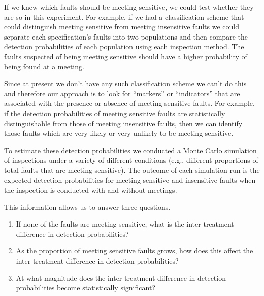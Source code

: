 If we knew which faults should be meeting sensitive, we could test 
whether they are so in this experiment. 
For example, if we had  
a classification scheme that could distinguish meeting sensitive 
from meeting insensitive faults we could 
separate each specification's faults into two 
populations and then compare the detection 
probabilities of each population using each inspection method.
The faults suspected of being meeting sensitive should have a higher
probability of being found at a meeting.

Since at present we don't have any such classification scheme
we can't do this and therefore our approach is to look
for ``markers'' or ``indicators'' that are associated with the
presence or absence of meeting sensitive faults.
For example, if the detection probabilities of meeting sensitive 
faults are statistically distinguishable from
those of meeting insensitive faults, then we can identify 
those faults which are very likely or very unlikely to be
meeting sensitive.  

To estimate these detection probabilities we conducted a
Monte Carlo simulation of inspections under a variety of 
different conditions (e.g., different proportions of 
total faults that are meeting sensitive). The outcome of each 
simulation run is the expected detection probabilities for meeting
sensitive and insensitive faults when the inspection is conducted 
with and without meetings.  

This information allows us to answer three questions.

\begin{enumerate}

\item If none of the faults are meeting sensitive, what is the 
inter-treatment difference in detection probabilities?

\item As the proportion of meeting sensitive faults grows, how
does this affect the inter-treatment difference in detection probabilities?

\item At what magnitude does the inter-treatment difference 
in detection probabilities become statistically significant?

\end{enumerate}


